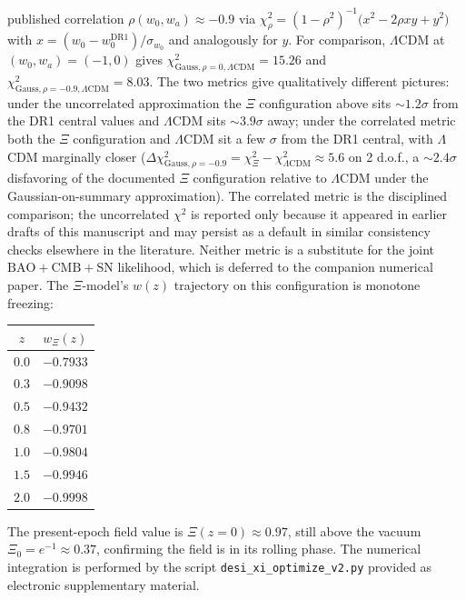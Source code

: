 \documentclass[11pt,reqno]{amsart}
\theoremstyle{plain}
\theoremstyle{definition}
\theoremstyle{remark}
\begin{document}
published correlation $\rho(w_0, w_a) \approx -0.9$ via
$\chi^{2}_{\rho} = (1-\rho^{2})^{-1}\bigl(x^{2}-2\rho x y + y^{2}\bigr)$
with $x=(w_0-w_0^{\text{DR1}})/\sigma_{w_0}$ and analogously for $y$.
For comparison, $\Lambda$CDM at $(w_0, w_a) = (-1, 0)$ gives
$\chi^{2}_{\text{Gauss},\rho=0,\Lambda\text{CDM}} = 15.26$ and
$\chi^{2}_{\text{Gauss},\rho=-0.9,\Lambda\text{CDM}} = 8.03$.
The two metrics give qualitatively different pictures: under the
uncorrelated approximation the $\Xi$ configuration above sits
$\sim 1.2\sigma$ from the DR1 central values and $\Lambda$CDM sits
$\sim 3.9\sigma$ away; under the correlated metric both the
$\Xi$ configuration and $\Lambda$CDM sit a few $\sigma$ from the
DR1 central, with $\Lambda$CDM marginally closer
($\Delta\chi^{2}_{\text{Gauss},\rho=-0.9}
= \chi^{2}_{\Xi} - \chi^{2}_{\Lambda\text{CDM}} \approx 5.6$ on
2 d.o.f., a $\sim 2.4\sigma$ disfavoring of the documented
$\Xi$ configuration relative to $\Lambda$CDM under the
Gaussian-on-summary approximation). The correlated
metric is the disciplined comparison; the uncorrelated $\chi^{2}$ is
reported only because it appeared in earlier drafts of this
manuscript and may persist as a default in similar consistency
checks elsewhere in the literature. Neither metric is a substitute
for the joint $\text{BAO} + \text{CMB} + \text{SN}$ likelihood,
which is deferred to the companion numerical paper. The
$\Xi$-model's $w(z)$ trajectory on this configuration is monotone
freezing:

\begin{center}
\begin{tabular}{c|c}
$z$ & $w_\Xi(z)$\\
\hline
$0.0$ & $-0.7933$\\
$0.3$ & $-0.9098$\\
$0.5$ & $-0.9432$\\
$0.8$ & $-0.9701$\\
$1.0$ & $-0.9804$\\
$1.5$ & $-0.9946$\\
$2.0$ & $-0.9998$
\end{tabular}
\end{center}

The present-epoch field value is $\Xi(z=0) \approx 0.97$, still above
the vacuum $\Xi_0 = e^{-1} \approx 0.37$, confirming the field is in
its rolling phase. The numerical integration is performed by the
script \texttt{desi\_xi\_optimize\_v2.py} provided as electronic
supplementary material.
\end{document}
